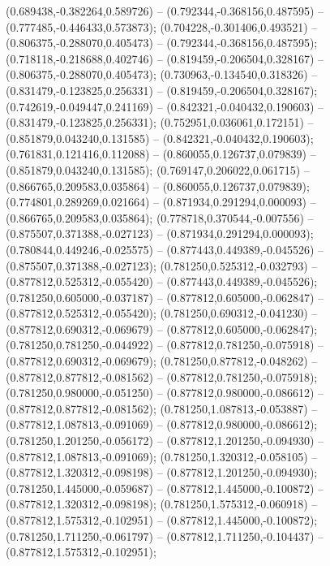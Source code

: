  (0.689438,-0.382264,0.589726) -- (0.792344,-0.368156,0.487595) -- (0.777485,-0.446433,0.573873);
 (0.704228,-0.301406,0.493521) -- (0.806375,-0.288070,0.405473) -- (0.792344,-0.368156,0.487595);
 (0.718118,-0.218688,0.402746) -- (0.819459,-0.206504,0.328167) -- (0.806375,-0.288070,0.405473);
 (0.730963,-0.134540,0.318326) -- (0.831479,-0.123825,0.256331) -- (0.819459,-0.206504,0.328167);
 (0.742619,-0.049447,0.241169) -- (0.842321,-0.040432,0.190603) -- (0.831479,-0.123825,0.256331);
 (0.752951,0.036061,0.172151) -- (0.851879,0.043240,0.131585) -- (0.842321,-0.040432,0.190603);
 (0.761831,0.121416,0.112088) -- (0.860055,0.126737,0.079839) -- (0.851879,0.043240,0.131585);
 (0.769147,0.206022,0.061715) -- (0.866765,0.209583,0.035864) -- (0.860055,0.126737,0.079839);
 (0.774801,0.289269,0.021664) -- (0.871934,0.291294,0.000093) -- (0.866765,0.209583,0.035864);
 (0.778718,0.370544,-0.007556) -- (0.875507,0.371388,-0.027123) -- (0.871934,0.291294,0.000093);
 (0.780844,0.449246,-0.025575) -- (0.877443,0.449389,-0.045526) -- (0.875507,0.371388,-0.027123);
 (0.781250,0.525312,-0.032793) -- (0.877812,0.525312,-0.055420) -- (0.877443,0.449389,-0.045526);
 (0.781250,0.605000,-0.037187) -- (0.877812,0.605000,-0.062847) -- (0.877812,0.525312,-0.055420);
 (0.781250,0.690312,-0.041230) -- (0.877812,0.690312,-0.069679) -- (0.877812,0.605000,-0.062847);
 (0.781250,0.781250,-0.044922) -- (0.877812,0.781250,-0.075918) -- (0.877812,0.690312,-0.069679);
 (0.781250,0.877812,-0.048262) -- (0.877812,0.877812,-0.081562) -- (0.877812,0.781250,-0.075918);
 (0.781250,0.980000,-0.051250) -- (0.877812,0.980000,-0.086612) -- (0.877812,0.877812,-0.081562);
 (0.781250,1.087813,-0.053887) -- (0.877812,1.087813,-0.091069) -- (0.877812,0.980000,-0.086612);
 (0.781250,1.201250,-0.056172) -- (0.877812,1.201250,-0.094930) -- (0.877812,1.087813,-0.091069);
 (0.781250,1.320312,-0.058105) -- (0.877812,1.320312,-0.098198) -- (0.877812,1.201250,-0.094930);
 (0.781250,1.445000,-0.059687) -- (0.877812,1.445000,-0.100872) -- (0.877812,1.320312,-0.098198);
 (0.781250,1.575312,-0.060918) -- (0.877812,1.575312,-0.102951) -- (0.877812,1.445000,-0.100872);
 (0.781250,1.711250,-0.061797) -- (0.877812,1.711250,-0.104437) -- (0.877812,1.575312,-0.102951);
